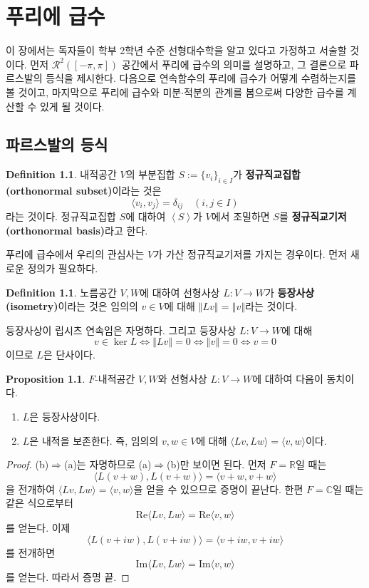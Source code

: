 \documentclass[11pt]{book}
\numberwithin{equation}{chapter}
\def\RR{\mathbb{R}}
\def\CC{\mathbb{C}}
\def\calR{\mathcal{R}}
\newcommand{\inner}[2]{\langle#1, #2\rangle}
\newcommand{\norm}[1]{\left\Vert#1\right\Vert}
\newcommand{\gen}[1]{\left\langle#1\right\rangle}
\theoremstyle{definition}
\newtheorem{prop}[thm]{Proposition}
\newtheorem{defn}[thm]{Definition}
\newenvironment{enum}
	{\begin{enumerate}[label=(\alph*), leftmargin=2\parindent]}
	{\end{enumerate}}
\begin{document}
\chapter{푸리에 급수}

이 장에서는 독자들이 학부 2학년 수준 선형대수학을 알고 있다고 가정하고 서술할 것이다. 먼저 \(\calR^2([-\pi, \pi])\) 공간에서 푸리에 급수의 의미를 설명하고, 그 결론으로 파르스발의 등식을 제시한다. 다음으로 연속함수의 푸리에 급수가 어떻게 수렴하는지를 볼 것이고, 마지막으로 푸리에 급수와 미분\(\cdot\)적분의 관계를 봄으로써 다양한 급수를 계산할 수 있게 될 것이다.

\section{파르스발의 등식}


\begin{defn}
    내적공간 \(V\)의 부분집합 \(S := \{v_i\}_{i \in I}\)가 \textbf{정규직교집합(orthonormal subset)}이라는 것은
    \[
    \inner{v_i}{v_j} = \delta_{ij} \quad(i, j \in I)    
    \]
    라는 것이다. 정규직교집합 \(S\)에 대하여 \(\gen{S}\)가 \(V\)에서 조밀하면 \(S\)를 \textbf{정규직교기저(orthonormal basis)}라고 한다.
\end{defn}

푸리에 급수에서 우리의 관심사는 \(V\)가 가산 정규직교기저를 가지는 경우이다. 먼저 새로운 정의가 필요하다.

\begin{defn}
    노름공간 \(V, W\)에 대하여 선형사상 \(L : V \to W\)가 \textbf{등장사상(isometry)}이라는 것은 임의의 \(v \in V\)에 대해 \(\norm{Lv} = \norm{v}\)라는 것이다.
\end{defn}

등장사상이 립시츠 연속임은 자명하다. 그리고 등장사상 \(L : V \to W\)에 대해
\[
    v \in \ker L \iff \norm{Lv} = 0 \iff \norm{v} = 0 \iff v = 0
\]
이므로 \(L\)은 단사이다.

\begin{prop}
    \(F\)-내적공간 \(V, W\)와 선형사상 \(L : V \to W\)에 대하여 다음이 동치이다.
    \begin{enum}
        \item \(L\)은 등장사상이다.
        \item \(L\)은 내적을 보존한다. 즉, 임의의 \(v, w \in V\)에 대해 \(\inner{Lv}{Lw}= \inner{v}{w}\)이다.
    \end{enum}
\end{prop}
\begin{proof}
    (b)\(\Rightarrow\)(a)는 자명하므로 (a)\(\Rightarrow\)(b)만 보이면 된다. 먼저 \(F = \RR\)일 때는
    \[
        \inner{L(v+w)}{L(v+w)} = \inner{v+w}{v+w}
    \]
    을 전개하여 \(\inner{Lv}{Lw} = \inner{v}{w}\)을 얻을 수 있으므로 증명이 끝난다. 한편 \(F = \CC\)일 때는 같은 식으로부터
    \[
        \mathrm{Re}\inner{Lv}{Lw} = \mathrm{Re}\inner{v}{w}
    \]
    를 얻는다. 이제
    \[
        \inner{L(v+iw)}{L(v+iw)} = \inner{v+iw}{v+iw}
    \]
    를 전개하면
    \[
        \mathrm{Im}\inner{Lv}{Lw} = \mathrm{Im}\inner{v}{w}
    \]
    를 얻는다. 따라서 증명 끝.
\end{proof}
\end{document}
